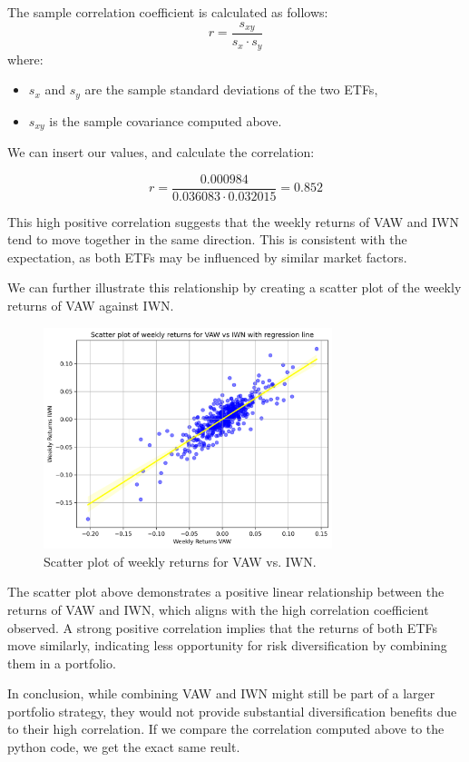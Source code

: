 \documentclass{rapport}
\begin{document}
\noindent
The sample correlation coefficient is calculated as follows:
\[
r = \frac{s_{xy}}{s_x \cdot s_y}
\]
where:
\begin{itemize}
    \item \( s_x \) and \( s_y \) are the sample standard deviations of the two ETFs,
    \item \( s_{xy} \) is the sample covariance computed above.
\end{itemize}

\noindent
We can insert our values, and calculate the correlation:

\[
r = \frac{0.000984}{0.036083 \cdot 0.032015} = 0.852
\]

\noindent
This high positive correlation suggests that the weekly returns of VAW and IWN tend to move together in the same direction. This is consistent with the expectation, as both ETFs may be influenced by similar market factors.

\noindent
We can further illustrate this relationship by creating a scatter plot of the weekly returns of VAW against IWN.
\begin{figure}[H]
    \centering
    \includegraphics[width=0.75\textwidth]{figure_8_scatter_plot.png}  %
    \caption{\small Scatter plot of weekly returns for VAW vs. IWN.}
    \label{fig:scatter_vaw_iwn}
\end{figure}

\noindent
The scatter plot above demonstrates a positive linear relationship between the returns of VAW and IWN, which aligns with the high correlation coefficient observed. A strong positive correlation implies that the returns of both ETFs move similarly, indicating less opportunity for risk diversification by combining them in a portfolio.

\noindent
In conclusion, while combining VAW and IWN might still be part of a larger portfolio strategy, they would not provide substantial diversification benefits due to their high correlation.
\noindent
If we compare the correlation computed above to the python code, we get the exact same reult. 
\end{document}
